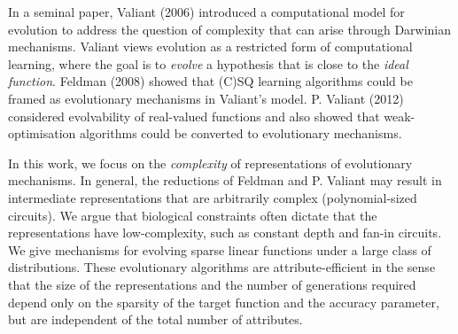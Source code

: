 In a seminal paper, Valiant (2006) introduced a computational model for
evolution to address the question of complexity that can arise through Darwinian
mechanisms. Valiant views evolution as a restricted form of computational
learning, where the goal is to \emph{evolve} a hypothesis that is close to the
\emph{ideal function}. Feldman (2008) showed that (C)SQ learning algorithms
could be framed as evolutionary mechanisms in Valiant's model. P. Valiant (2012)
considered evolvability of real-valued functions and also showed that
weak-optimisation algorithms could be converted to evolutionary mechanisms.

In this work, we focus on the \emph{complexity} of representations of
evolutionary mechanisms. In general, the reductions of Feldman and P. Valiant may
result in intermediate representations that are arbitrarily complex
(polynomial-sized circuits). We argue that biological constraints often dictate
that the representations have low-complexity, such as constant depth and fan-in
circuits. 
We give mechanisms for evolving sparse linear functions under a large
class of distributions. These evolutionary algorithms are attribute-efficient in
the sense that the size of the representations and the number of generations
required depend only on the sparsity of the target function and the accuracy
parameter, but are independent of the total number of attributes.

